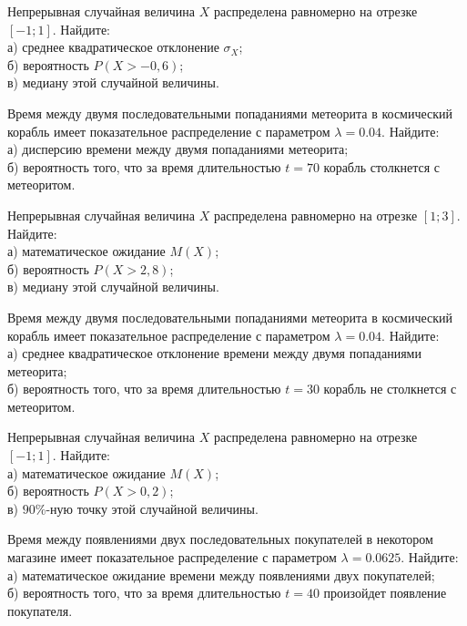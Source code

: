 \vfill

\newpage\setcounter{zad}{0}

\z Непрерывная случайная величина $X$ распределена равномерно на отрезке $[-1; 1]$. Найдите: \\ \quad а) среднее квадратическое отклонение $\sigma_X$; \\ \quad б) вероятность $P(X>-0{,}6)$; \\ \quad в) медиану этой случайной величины.


\vfill

\z Время между двумя последовательными попаданиями метеорита в космический корабль имеет показательное распределение с параметром $\lambda = 0.04$. Найдите: \\ \quad а) дисперсию времени между двумя попаданиями метеорита; \\ \quad б) вероятность того, что за время длительностью $t = 70$ корабль  столкнется с метеоритом.
 

\vfill

\newpage\setcounter{zad}{0}

\z Непрерывная случайная величина $X$ распределена равномерно на отрезке $[1; 3]$. Найдите: \\ \quad а) математическое ожидание $M(X)$; \\ \quad б) вероятность $P(X>2{,}8)$; \\ \quad в) медиану этой случайной величины.


\vfill

\z Время между двумя последовательными попаданиями метеорита в космический корабль имеет показательное распределение с параметром $\lambda = 0.04$. Найдите: \\ \quad а) среднее квадратическое отклонение времени между двумя попаданиями метеорита; \\ \quad б) вероятность того, что за время длительностью $t = 30$ корабль не столкнется с метеоритом.
 

\vfill

\newpage\setcounter{zad}{0}

\z Непрерывная случайная величина $X$ распределена равномерно на отрезке $[-1; 1]$. Найдите: \\ \quad а) математическое ожидание $M(X)$; \\ \quad б) вероятность $P(X>0{,}2)$; \\ \quad в) $90\%$-ную точку этой случайной величины.


\vfill

\z Время между появлениями двух последовательных покупателей в некотором магазине имеет показательное распределение с параметром $\lambda = 0.0625$. Найдите: \\ \quad а) математическое ожидание времени между появлениями двух покупателей; \\ \quad б) вероятность того, что за время длительностью $t = 40$  произойдет появление покупателя.
 


